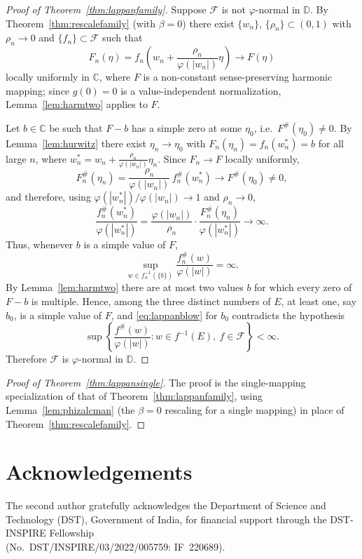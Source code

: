 \documentclass[10pt,a4paper]{amsart}
\newcommand{\D}{\mathbb{D}}
\newcommand{\C}{\mathbb{C}}
\begin{document}
\begin{proof}[Proof of Theorem~\textup{\ref{thm:lappanfamily}}]
Suppose $\mathcal F$ is not $\varphi$-normal in $\D$. By Theorem~\ref{thm:rescalefamily}
(with $\beta=0$) there exist $\{w_{n}\}$, $\{\rho_{n}\}\subset(0,1)$ with $\rho_{n}\to0$ and
$\{f_{n}\}\subset\mathcal F$ such that
\[
F_{n}(\eta)=f_{n}\!\left(w_{n}+\frac{\rho_{n}}{\varphi(|w_{n}|)}\eta\right)\longrightarrow F(\eta)
\]
locally uniformly in $\C$, where $F$ is a non-constant sense-preserving harmonic mapping;
since $g(0)=0$ is a value-independent normalization, Lemma~\ref{lem:harmtwo} applies to $F$.

Let $b\in\C$ be such that $F-b$ has a simple zero at some $\eta_{0}$, i.e.\
$F^{\#}(\eta_{0})\neq0$. By Lemma~\ref{lem:hurwitz} there exist $\eta_{n}\to\eta_{0}$ with
$F_{n}(\eta_{n})=f_{n}(w_{n}^{*})=b$ for all large $n$, where
$w_{n}^{*}=w_{n}+\tfrac{\rho_{n}}{\varphi(|w_{n}|)}\eta_{n}$. Since $F_{n}\to F$ locally
uniformly,
\[
F_{n}^{\#}(\eta_{n})=\frac{\rho_{n}}{\varphi(|w_{n}|)}\,f_{n}^{\#}(w_{n}^{*})
\longrightarrow F^{\#}(\eta_{0})\neq0,
\]
and therefore, using $\varphi(|w_{n}^{*}|)/\varphi(|w_{n}|)\to1$ and $\rho_{n}\to0$,
\[
\frac{f_{n}^{\#}(w_{n}^{*})}{\varphi(|w_{n}^{*}|)}
=\frac{\varphi(|w_{n}|)}{\rho_{n}}\cdot\frac{F_{n}^{\#}(\eta_{n})}{\varphi(|w_{n}^{*}|)}
\longrightarrow\infty.
\]
Thus, whenever $b$ is a simple value of $F$,
\begin{equation}\label{eq:lappanblow}
\sup_{w\in f_{n}^{-1}(\{b\})}\frac{f_{n}^{\#}(w)}{\varphi(|w|)}=\infty.
\end{equation}
By Lemma~\ref{lem:harmtwo} there are at most two values $b$ for which every zero of $F-b$ is
multiple. Hence, among the three distinct numbers of $E$, at least one, say $b_{0}$, is a
simple value of $F$, and \eqref{eq:lappanblow} for $b_{0}$ contradicts the hypothesis
\[
\sup\left\{\frac{f^{\#}(w)}{\varphi(|w|)}:w\in f^{-1}(E),\ f\in\mathcal F\right\}<\infty.
\]
Therefore $\mathcal F$ is $\varphi$-normal in $\D$.
\end{proof}

\begin{proof}[Proof of Theorem~\textup{\ref{thm:lappansingle}}]
The proof is the single-mapping specialization of that of
Theorem~\ref{thm:lappanfamily}, using Lemma~\ref{lem:phizalcman} (the $\beta=0$ rescaling
for a single mapping) in place of Theorem~\ref{thm:rescalefamily}.
\end{proof}

\section*{Acknowledgements}
The second author gratefully acknowledges the Department of Science and Technology (DST),
Government of India, for financial support through the DST-INSPIRE Fellowship\\
(No.\ DST/INSPIRE/03/2022/005759: IF~220689).
\end{document}
